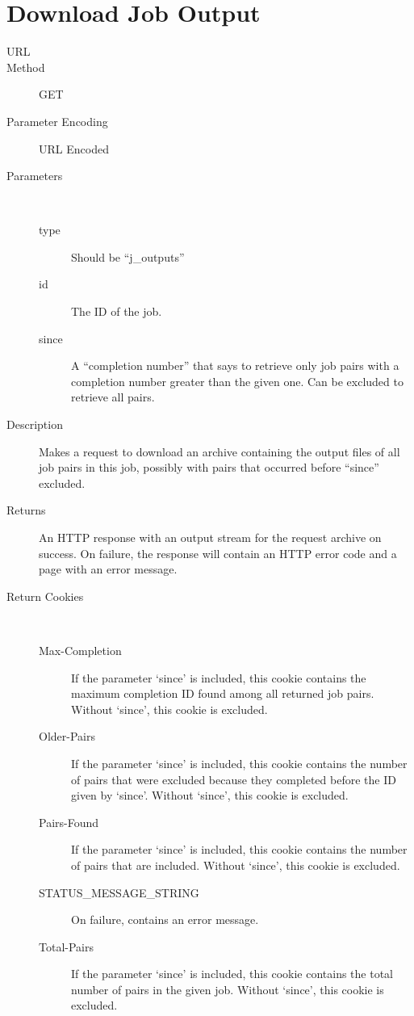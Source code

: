 \section{Download Job Output}
\begin{description}
\item [URL] 
\item [Method] GET
\item [Parameter Encoding] URL Encoded
\item [Parameters] \
	\begin{description}
	\item [type]  Should be “j\_outputs”
	\item [id]   The ID of the job.
	\item [since] \type{Integer} A “completion number” that says to retrieve only job pairs with a completion number greater than the given one. Can be excluded to retrieve all pairs.
	\end{description}
\item [Description] Makes a request to download an archive containing the output files of all job pairs in this job, possibly with pairs that occurred before “since” excluded.
\item [Returns] An HTTP response with an output stream for the request archive on success. On failure, the response will contain an HTTP error code and a page with an error message.
\item [Return Cookies] \
	\begin{description}
	\item [Max-Completion]  If the parameter ‘since’ is included, this cookie contains the maximum completion ID found among all returned job pairs. Without ‘since’, this cookie is excluded.
	\item [Older-Pairs]  If the parameter ‘since’ is included, this cookie contains the number of pairs that were excluded because they completed before the ID given by ‘since’. Without ‘since’, this cookie is excluded.
	\item [Pairs-Found]  If the parameter ‘since’ is included, this cookie contains the number of pairs that are included. Without ‘since’, this cookie is excluded.
	\item [STATUS\_MESSAGE\_STRING] \type{String} On failure, contains an error message.
	\item [Total-Pairs] \type{Integer} If the parameter ‘since’ is included, this cookie contains the total number of pairs in the given job. Without ‘since’, this cookie is excluded.
	\end{description}
\end{description}


